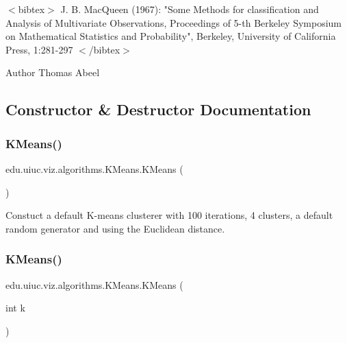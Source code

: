 $<$bibtex$>$ J. B. Mac\+Queen (1967)\+: "Some Methods for classification and Analysis of Multivariate Observations, Proceedings of 5-\/th Berkeley Symposium on Mathematical Statistics and Probability", Berkeley, University of California Press, 1\+:281-\/297 $<$/bibtex$>$

\begin{DoxyAuthor}{Author}
Thomas Abeel 
\end{DoxyAuthor}


\subsection{Constructor \& Destructor Documentation}
\mbox{\label{classedu_1_1uiuc_1_1viz_1_1algorithms_1_1_k_means_a7681bf0f2521c385838b853c11d95aa9}} 
\subsubsection{\texorpdfstring{KMeans()}{KMeans()}\hspace{0.1cm}{\footnotesize\ttfamily [1/4]}}
{\footnotesize\ttfamily edu.\+uiuc.\+viz.\+algorithms.\+K\+Means.\+K\+Means (\begin{DoxyParamCaption}{ }\end{DoxyParamCaption})}

Constuct a default K-\/means clusterer with 100 iterations, 4 clusters, a default random generator and using the Euclidean distance. \mbox{\label{classedu_1_1uiuc_1_1viz_1_1algorithms_1_1_k_means_ab3126bebfc8ed429dd34a5e05da7e7e3}} 
\subsubsection{\texorpdfstring{KMeans()}{KMeans()}\hspace{0.1cm}{\footnotesize\ttfamily [2/4]}}
{\footnotesize\ttfamily edu.\+uiuc.\+viz.\+algorithms.\+K\+Means.\+K\+Means (\begin{DoxyParamCaption}\item[{int}]{k }\end{DoxyParamCaption})}

